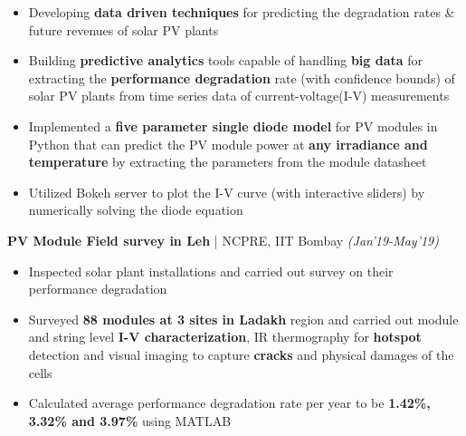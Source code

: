 \documentclass[a4paper, 10pt]{article}
\begin{document}
	\vspace{-0.2cm} \begin{itemize}
		\setlength\itemsep{0pt}
		\setlength\parskip{0pt}
		\item Developing \textbf{data driven techniques} for predicting the degradation rates \& future revenues of solar PV plants
		\item Building \textbf{predictive analytics} tools capable of handling \textbf{big data} for extracting the \textbf{performance degradation} rate (with confidence bounds) of solar PV plants from time series data of current-voltage(I-V) measurements
		\item  Implemented a \textbf{five parameter single diode model} for PV modules in Python that can predict the PV module power at \textbf{any irradiance and temperature} by extracting the parameters from the module datasheet
		\item Utilized Bokeh server to plot the I-V curve (with interactive sliders) by numerically solving the diode equation
    \end{itemize}\vspace{-5pt}
	
\vspace{-0.15cm}\flushleft\textbf{\large PV Module Field survey in Leh} | NCPRE, IIT Bombay \hfill \emph{(Jan'19-May'19)}\\

	\vspace{-0.2cm} \begin{itemize}
		\setlength\itemsep{0pt}
		\setlength\parskip{0pt}
\item Inspected solar plant installations and carried out survey on their performance degradation
\item Surveyed \textbf{88 modules at 3 sites in Ladakh} region and carried out module and string level \textbf{I-V characterization}, IR thermography for \textbf{hotspot} detection and visual imaging to capture \textbf{cracks} and physical damages of the cells
\item Calculated average performance degradation rate per year to be \textbf{1.42\%, 3.32\% and 3.97\%} using MATLAB	
\end{itemize}\vspace{-5pt} 
\end{document}
